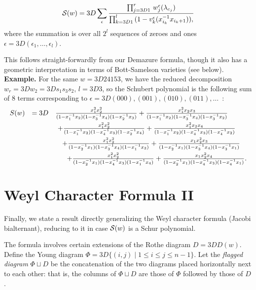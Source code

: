 \begin{thm}
$$
{\cal S}(w) =3D
\sum_{\epsilon}
{ \prod_{j =3D 1}^r \,  w_j^{\epsilon}(\lambda_{c_j})
  \over
  \prod_{k =3D 1}^l \,
  (1- v_k^{\epsilon}(x_{i_k}^{-1} x_{i_k+1})) ,
}
$$
where the summation is over all $2^l$  sequences
of zeroes and ones $\epsilon =3D (\epsilon_1, \ldots, \epsilon_l)$.
\end{thm}
This follows straight-forwardly from our Demazure formula,
though it also has a geometric interpretation in terms of
Bott-Samelson varieties (see below).
{\bf Example.}  For the same $w =3D 24153$,
we have the reduced decomposition $w_r =3D w_2 =3D s_1 s_3 s_2$,
$l =3D 3$,
so the Schubert polynomial is the following sum of
8 terms corresponding
to $\epsilon =3D (000), (001), (010), (011), \ldots$\ :
$$
\begin{array}{rcl}
S(w) & =3D &
{ x_1^2 x_2^2
\over
(1 - x_1^{-1} x_2) (1 - x_3^{-1} x_4) (1 - x_2^{-1} x_3) }
+
{ x_1^2 x_2 x_3
\over
(1 - x_1^{-1} x_2) (1 - x_3^{-1} x_4) (1 - x_3^{-1} x_2)  }
\\[.7em]
& & \
+
{ x_1^2 x_2^2
\over
(1 - x_1^{-1} x_2) (1 - x_4^{-1} x_3) (1 - x_2^{-1} x_4) }
+
{ x_1^2 x_2 x_4
\over
(1 - x_1^{-1} x_2) (1 - x_4^{-1} x_3) (1 - x_4^{-1} x_2)  }
\\[.7em]
& & \ \ \
+
{ x_1^2 x_2^2
\over
(1 - x_2^{-1} x_1) (1 - x_3^{-1} x_4) (1 - x_1^{-1} x_3)  }
+
{ x_1 x_2^2 x_3
\over
(1 - x_2^{-1} x_1) (1 - x_3^{-1} x_4) (1 - x_3^{-1} x_1)  }
\\[.7em]
& & \ \ \ \ \
+
{ x_1^2 x_2^2
\over
(1 - x_2^{-1} x_1) (1 - x_4^{-1} x_3) (1 - x_1^{-1} x_4)  }
+
{ x_1 x_2^2 x_4
\over
(1 - x_2^{-1} x_1) (1 - x_4^{-1} x_3) (1 - x_4^{-1} x_1)  } .
\end{array}
$$


\section{Weyl Character Formula II}
\label{Weyl II}

Finally, we state a result directly generalizing
the Weyl character formula (Jacobi bialternant), reducing to
it in case ${\cal S}(w)$ is a Schur polynomial.

The formula involves
certain extensions of the Rothe diagram $D =3D D(w)$.
Define the Young diagram
$\Phi =3D \{ (i,j) \mid 1 \leq i \leq j \leq n-1 \}$.
Let the {\em flagged diagram }
$\Phi \sqcup D$ be the concatenation
of the two diagrams placed horizontally next to each other:
that is, the columns of $\Phi \sqcup D$
are those of $\Phi$ followed by those of $D$.

